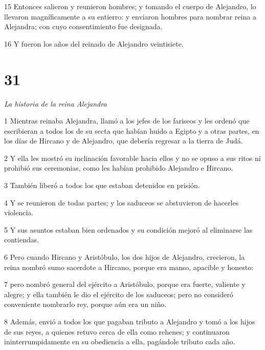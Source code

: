 \par 15 Entonces salieron y reunieron hombres; y tomando el cuerpo de Alejandro, lo llevaron magníficamente a su entierro: y enviaron hombres para nombrar reina a Alejandra; con cuyo consentimiento fue designada.

\par 16 Y fueron los años del reinado de Alejandro veintisiete.

\chapter{31}

\par \textit{La historia de la reina Alejandra}

\par 1 Mientras reinaba Alejandra, llamó a los jefes de los fariseos y les ordenó que escribieran a todos los de su secta que habían huido a Egipto y a otras partes, en los días de Hircano y de Alejandro, que debería regresar a la tierra de Judá.

\par 2 Y ella les mostró su inclinación favorable hacia ellos y no se opuso a sus ritos ni prohibió sus ceremonias, como les habían prohibido Alejandro e Hircano.

\par 3 También liberó a todos los que estaban detenidos en prisión.

\par 4 Y se reunieron de todas partes; y los saduceos se abstuvieron de hacerles violencia.

\par 5 Y sus asuntos estaban bien ordenados y su condición mejoró al eliminarse las contiendas.

\par 6 Pero cuando Hircano y Aristóbulo, los dos hijos de Alejandro, crecieron, la reina nombró sumo sacerdote a Hircano, porque era manso, apacible y honesto:

\par 7 pero nombró general del ejército a Aristóbulo, porque era fuerte, valiente y alegre; y ella también le dio el ejército de los saduceos; pero no consideró conveniente nombrarlo rey, porque aún era un niño.

\par 8 Además, envió a todos los que pagaban tributo a Alejandro y tomó a los hijos de sus reyes, a quienes retuvo cerca de ella como rehenes; y continuaron ininterrumpidamente en su obediencia a ella, pagándole tributo cada año.

